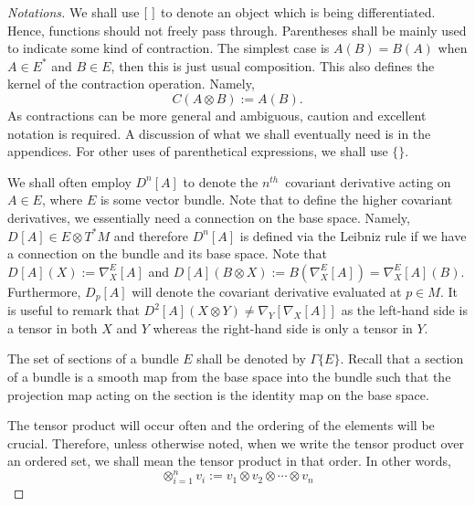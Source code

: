 \documentclass[11pt]{article}
\theoremstyle{remark}
\begin{document}
\begin{proof}[{Notations}] {
We shall use $[ \hspace{.05in}]$ to denote an object which is being
differentiated. Hence, functions should not freely pass
through. Parentheses shall be mainly used to indicate some kind of
 contraction. The
simplest case is  $A(B) = B(A)$ when $A \in \ensuremath{{E}^{*}}$ and $ B \in E$, then
this is just usual composition. This also defines the kernel of the
contraction 
operation. Namely, \[C(A \otimes B) \ensuremath{:=} A(B).\] As contractions can
be more general and ambiguous, caution and excellent notation is
required. A discussion of what we shall eventually need is in the
appendices. For other uses of parenthetical expressions, we shall use
$\{ \}$. 


We shall often employ
$D^n[A]$ to denote the \ensuremath{{n}^{th}}\ covariant derivative acting on $A \in E$,
where $E$ is some vector bundle. Note that to define the higher
covariant derivatives, we essentially need a connection on the base
space. Namely, 
$\ensuremath{D^{} [{A}] {} } \in E \otimes \ensuremath{T^* M}$ and therefore $D^n[A]$ is 
defined via the Leibniz rule 
if we have a connection on the bundle and its base space. Note
that $\ensuremath{D^{} [{A}] ({X}) } \ensuremath{:=} \ensuremath{{{\nabla}}_{X}^{E}{[A]}}$ and $\ensuremath{D^{} [{A}] ({B \otimes X}) }
\ensuremath{:=} B(\ensuremath{{{\nabla}}_{X}^{E}{[A]}}) = \ensuremath{{{\nabla}}_{X}^{E}{[A]}}( B)$. Furthermore,
$D_p [A]$ will denote
 the covariant derivative evaluated at $p \in M$. It is
useful to remark that $\ensuremath{D^{2} [{A}] ({X\otimes Y}) } \neq
\ensuremath{{{\nabla}}_{Y}^{}{[\ensuremath{{{\nabla}}_{X}^{}{[A]}}]}}$ as the left-hand side is a tensor in
both $X$ and $Y$ whereas the right-hand side is only a tensor in
$Y$.

The set of sections of a bundle $E$ shall be denoted by
\ensuremath{\Gamma \{ E \}}. Recall that a section of a bundle is a smooth map from
the base space into the bundle such that the projection map acting on
the section is the identity map on the base space.  

The tensor product will occur often and the ordering of the elements
will be crucial. Therefore, unless otherwise noted, when we write the
tensor product over an ordered set, we shall mean the tensor product
in that order. In other words, 
\[
\mathop{\otimes}_{i = 1}^n v_i \ensuremath{:=} v_1 \otimes v_2 \otimes \dotsm \otimes v_n
\]
}
 \end{proof}
\end{document}
